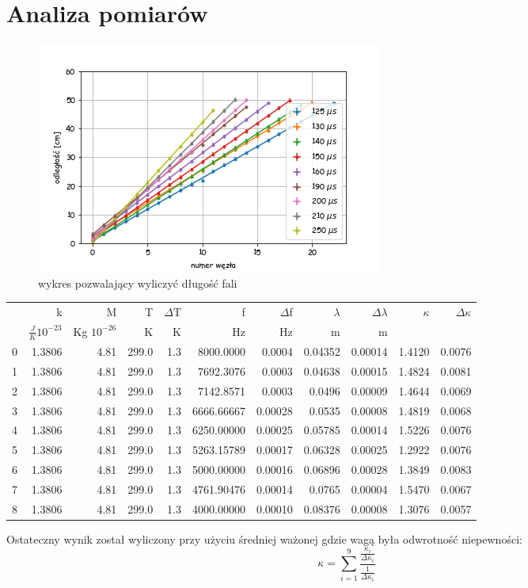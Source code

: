 \documentclass[a4paper,10pt]{article}
\begin{document}
\section{Analiza pomiarów}

\begin{figure}[H]
  \includegraphics{./Kappa.png}
  \caption{wykres pozwalający wyliczyć długość fali}
  \label{}
\end{figure}
\begin{tabular}{lrrrrrrrrrr}
{} &             k &             M &      T &  $\Delta$T &            f &  $\Delta$f &  $\lambda$ &  $\Delta \lambda$ &  $ \kappa$ &  $\Delta \kappa$ \\
{} & $\frac{J}{K} 10^{-23}$ & Kg $10^{-26}$ & K & K & Hz & Hz & m & m &&\\
0 &  1.3806 &  4.81 &  299.0 &   1.3 &  8000.0000 &   0.0004 &   0.04352 &     0.00014 &   1.4120 &   0.0076 \\
1 &  1.3806 &  4.81 &  299.0 &   1.3 &  7692.3076 &   0.0003 &   0.04638 &     0.00015 &   1.4824 &   0.0081 \\
2 &  1.3806 &  4.81 &  299.0 &   1.3 &  7142.8571 &   0.0003 &   0.0496 &      0.00009 &   1.4644 &   0.0069 \\
3 &  1.3806 &  4.81 &  299.0 &   1.3 &  6666.66667 &   0.00028 &   0.0535 &      0.00008 &   1.4819 &   0.0068 \\
4 &  1.3806 &  4.81 &  299.0 &   1.3 &  6250.00000 &   0.00025 &   0.05785 &     0.00014 &    1.5226 &   0.0076 \\
5 &  1.3806 &  4.81 &  299.0 &   1.3 &  5263.15789 &   0.00017 &   0.06328 &     0.00025 &    1.2922 &   0.0076 \\
6 &  1.3806 &  4.81 &  299.0 &   1.3 &  5000.00000 &   0.00016 &   0.06896 &     0.00028 &    1.3849 &   0.0083 \\
7 &  1.3806 &  4.81 &  299.0 &   1.3 &  4761.90476 &   0.00014 &   0.0765 &      0.00004 &    1.5470 &   0.0067 \\
8 &  1.3806 &  4.81 &  299.0 &   1.3 &  4000.00000 &   0.00010 &   0.08376 &      0.00008 &    1.3076 &   0.0057 \\
\end{tabular}
Ostateczny wynik został wyliczony przy użyciu średniej ważonej gdzie wagą była odwrotność niepewności:
\begin{equation}
  \kappa = \sum_{i=1}^{9} \frac{\frac{\kappa_i}{\Delta \kappa_i}}{\frac{1}{\Delta \kappa_i}}
\end{equation}
\end{document}
